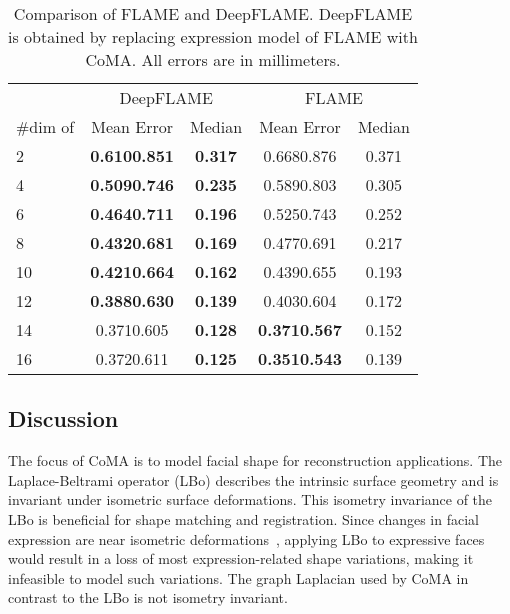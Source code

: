 \begin{table}[t]
\begin{center}
\caption{Comparison of FLAME and DeepFLAME. DeepFLAME is obtained by replacing expression model of FLAME with CoMA. All errors are in millimeters.}
\begin{tabular}{l|cc|cc}
&  \multicolumn{2}{|c}{DeepFLAME} & \multicolumn{2}{|c}{FLAME \cite{FLAME2017}}  \\
\#dim of    &  Mean Error & Median & Mean Error & Median  \\ \hline
2 & \textbf{0.6100.851} & \textbf{0.317} & 0.6680.876 & 0.371 \\
4 &  \textbf{0.5090.746} & \textbf{0.235} &0.5890.803 & 0.305 \\
6 &  \textbf{0.4640.711} & \textbf{0.196} &0.5250.743 & 0.252 \\
8 &  \textbf{0.4320.681} & \textbf{0.169} &0.4770.691 & 0.217 \\
10 &  \textbf{0.4210.664} & \textbf{0.162} &0.4390.655 & 0.193 \\
12 &  \textbf{0.3880.630} & \textbf{0.139} &0.4030.604 & 0.172 \\
14 &  0.3710.605 & \textbf{0.128} &\textbf{0.3710.567} & 0.152 \\
16 &  0.3720.611 & \textbf{0.125} &\textbf{0.3510.543} & 0.139
\end{tabular}
\label{tab:ablexp}
\end{center}
\end{table}















\subsection{Discussion}

The focus of CoMA is to model facial shape for reconstruction applications. The Laplace-Beltrami operator (LBo) describes the intrinsic surface geometry and is invariant under isometric surface deformations. This isometry invariance of the LBo is beneficial for shape matching and registration. Since changes in facial expression are near isometric deformations~\cite[Section 13.3]{Bronstein2008}, applying LBo to expressive faces would result in a loss of most expression-related shape variations, making it infeasible to model such variations. The graph Laplacian used by CoMA in contrast to the LBo is not isometry invariant.

